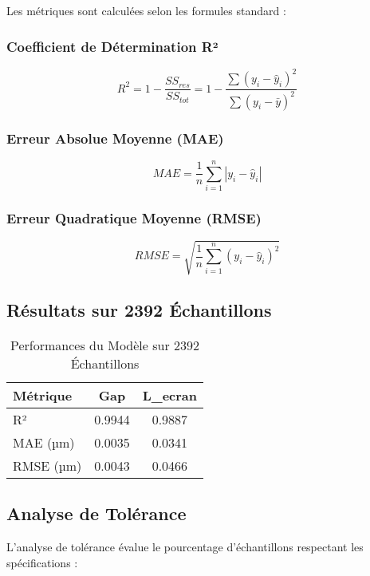 \documentclass[10pt,twocolumn]{article}
\begin{document}
Les métriques sont calculées selon les formules standard :

\subsubsection{Coefficient de Détermination R²}
\begin{equation}
R^2 = 1 - \frac{SS_{res}}{SS_{tot}} = 1 - \frac{\sum(y_i - \hat{y}_i)^2}{\sum(y_i - \bar{y})^2}
\end{equation}

\subsubsection{Erreur Absolue Moyenne (MAE)}
\begin{equation}
MAE = \frac{1}{n}\sum_{i=1}^{n}|y_i - \hat{y}_i|
\end{equation}

\subsubsection{Erreur Quadratique Moyenne (RMSE)}
\begin{equation}
RMSE = \sqrt{\frac{1}{n}\sum_{i=1}^{n}(y_i - \hat{y}_i)^2}
\end{equation}

\subsection{Résultats sur 2392 Échantillons}

\begin{table}[H]
\centering
\caption{Performances du Modèle sur 2392 Échantillons}
\begin{tabular}{lcc}
\toprule
\rowcolor{lightblue!20}
\textbf{Métrique} & \textbf{Gap} & \textbf{L\_ecran} \\
\midrule
R² & 0.9944 & 0.9887 \\
MAE (µm) & 0.0035 & 0.0341 \\
RMSE (µm) & 0.0043 & 0.0466 \\
\bottomrule
\end{tabular}
\end{table}

\subsection{Analyse de Tolérance}

L'analyse de tolérance évalue le pourcentage d'échantillons respectant les spécifications :
\end{document}
